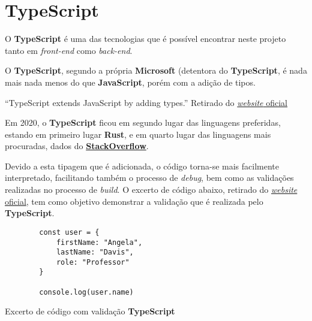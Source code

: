 \section{TypeScript}

\begin{minipage}[t]{.3\textwidth}
\end{minipage}
\begin{minipage}[t]{.7\textwidth}
	\minipagerestore

	O \textbf{TypeScript} é uma das tecnologias que é possível encontrar neste projeto tanto em \textit{front-end} como \textit{back-end}.

	O \textbf{TypeScript}, segundo a própria \textbf{Microsoft} (detentora do \textbf{TypeScript}, é nada mais nada menos do que \textbf{JavaScript}, porém com a adição de tipos.

	\begin{quotebox}
		``TypeScript extends JavaScript by adding types.''
		\tcblower
		Retirado do \href{https://www.typescriptlang.org}{\textit{website} oficial}
	\end{quotebox}

\end{minipage}

\vspace{0.2cm}

Em 2020, o \textbf{TypeScript} ficou em segundo lugar das linguagens preferidas, estando em primeiro lugar \textbf{Rust}, e em quarto lugar das linguagens mais procuradas, dados do \href{https://insights.stackoverflow.com/survey/2020#technology-most-loved-dreaded-and-wanted-languages-loved}{\textbf{StackOverflow}}.

Devido a esta tipagem que é adicionada, o código torna-se mais facilmente interpretado, facilitando também o processo de \textit{debug}, bem como as validações realizadas no processo de \textit{build}. O excerto de código abaixo, retirado do \href{https://www.typescriptlang.org}{\textit{website} oficial}, tem como objetivo demonstrar a validação que é realizada pelo \textbf{TypeScript}.

\begin{longlisting}
	\begin{verbatim}
		const user = {
			firstName: "Angela",
			lastName: "Davis",
			role: "Professor"
		}

		console.log(user.name)
	\end{verbatim}

	\caption{Excerto de código com validação \textbf{TypeScript}}
\end{longlisting}

